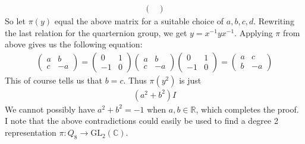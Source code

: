 \documentclass[12pt]{article}
\theoremstyle{definitionstyle}
\def\mbb#1{\mathbb{#1}}
\def\C{\mbb{C}}
\def\R{\mbb{R}}
\begin{document}
\begin{enumerate}
\begin{align*}
\begin{pmatrix}
			\end{pmatrix}
		\end{align*}
		So let $\pi(y)$ equal the above matrix for a suitable choice of $a,b,c,d$. Rewriting the last relation for the quarternion group, we get $y = x^{-1}yx^{-1}$. Applying $\pi$ from above gives us the following equation:
		\begin{align*}
			\begin{pmatrix}
				a & b \\
				c & -a
			\end{pmatrix} = \begin{pmatrix}
				0 & 1 \\
				-1 & 0
			\end{pmatrix}\begin{pmatrix}
				a & b \\
				c & -a
			\end{pmatrix}\begin{pmatrix}
				0 & 1 \\
				-1 & 0
			\end{pmatrix} = \begin{pmatrix}
				a & c \\
				b & -a
			\end{pmatrix}
		\end{align*}
		This of course tells us that $b = c$. Thus $\pi(y^2)$ is just
		\begin{align*}
				(a^2+b^2)I
		\end{align*}
		We cannot possibly have $a^2+b^2 = -1$ when $a, b \in \R$, which completes the proof. I note that the above contradictions could easily be used to find a degree 2 representation $\pi: Q_8 \to \mathrm{GL}_2(\C)$.
		

\end{enumerate}
\end{document}
